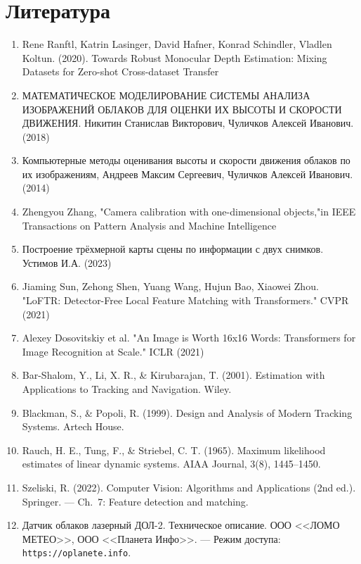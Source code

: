\documentclass[11pt]{article} %
\begin{document}
	\pagebreak
	
	\section{Литература}
	\begin{enumerate}
		\item {Rene Ranftl, Katrin Lasinger, David Hafner, Konrad Schindler,
			Vladlen Koltun. (2020). Towards Robust Monocular Depth Estimation:
			Mixing Datasets for Zero-shot Cross-dataset Transfer}
		\item {МАТЕМАТИЧЕСКОЕ МОДЕЛИРОВАНИЕ СИСТЕМЫ
			АНАЛИЗА ИЗОБРАЖЕНИЙ ОБЛАКОВ ДЛЯ ОЦЕНКИ
			ИХ ВЫСОТЫ И СКОРОСТИ ДВИЖЕНИЯ. Никитин Станислав Викторович, Чуличков Алексей Иванович. (2018)
		}
		\item {Компьютерные методы оценивания высоты и скорости движения облаков по их изображениям, Андреев Максим Сергеевич, Чуличков Алексей Иванович. (2014)}
		\item {Zhengyou Zhang, "Camera calibration with one-dimensional
			objects,"in IEEE Transactions on Pattern Analysis and Machine Intelligence
		}
		\item {Построение трёхмерной карты сцены по информации с двух снимков. Устимов И.А. (2023)}
		\item {Jiaming Sun, Zehong Shen, Yuang Wang, Hujun Bao, Xiaowei Zhou. "LoFTR: Detector-Free Local Feature Matching with Transformers." CVPR (2021)}
		\item {Alexey Dosovitskiy et al. "An Image is Worth 16x16 Words: Transformers for Image Recognition at Scale." ICLR (2021)}
		\item {Bar-Shalom, Y., Li, X. R., \& Kirubarajan, T. (2001). Estimation with Applications to Tracking and Navigation. Wiley.}
		\item {Blackman, S., \& Popoli, R. (1999). Design and Analysis of Modern Tracking Systems. Artech House.}
		\item {Rauch, H. E., Tung, F., \& Striebel, C. T. (1965). Maximum likelihood estimates of linear dynamic systems. AIAA Journal, 3(8), 1445–1450.}
		\item {Szeliski, R. (2022). Computer Vision: Algorithms and Applications (2nd ed.). Springer. --- Ch.~7: Feature detection and matching.}
		\item {Датчик облаков лазерный ДОЛ-2. Техническое описание. ООО <<ЛОМО МЕТЕО>>, ООО <<Планета Инфо>>. --- Режим доступа: \texttt{https://oplanete.info}.}
	\end{enumerate}
	
\end{document}

